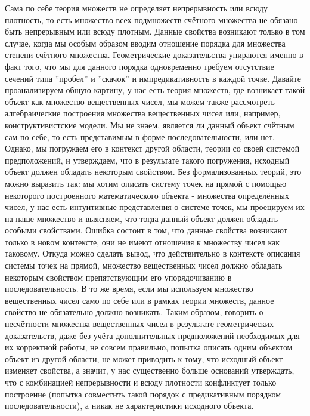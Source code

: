 \documentclass[12pt]{article}
\begin{document}
Сама по себе теория множеств не определяет непрерывность или всюду плотность, то есть множество всех подмножеств счётного множества не обязано быть непрерывным или всюду плотным. Данные свойства возникают только в том случае, когда мы особым образом вводим отношение порядка для множества степени счётного множества. Геометрические доказательства упираются именно в факт того, что мы для данного порядка одновременно требуем отсутствие сечений типа ''пробел'' и ''скачок'' и импредикативность в каждой точке. Давайте проанализируем общую картину, у нас есть теория множеств, где возникает такой объект как множество вещественных чисел, мы можем также рассмотреть алгебраические построения множества вещественных чисел или, например, конструктивистские модели. Мы не знаем, является ли данный объект счётным сам по себе, то есть представимым в форме последовательности, или нет. Однако, мы погружаем его в контекст другой области, теории со своей системой предположений, и утверждаем, что в результате такого погружения, исходный объект должен обладать некоторым свойством. Без формализованных теорий, это можно выразить так: мы хотим описать систему точек на прямой с помощью некоторого построенного математического объекта - множества определённых чисел, у нас есть интуитивные представления о системе точек, мы проецируем их на наше множество и выясняем, что тогда данный объект должен обладать особыми свойствами. Ошибка состоит в том, что данные свойства возникают только в новом контексте, они не имеют отношения к множеству чисел как таковому. Откуда можно сделать вывод, что действительно в контексте описания системы точек на прямой, множество вещественных чисел должно обладать некоторым свойством препятствующим его упорядочиванию в последовательность. В то же время, если мы используем множество вещественных чисел само по себе или в рамках теории множеств, данное свойство не обязательно должно возникать. Таким образом, говорить о несчётности множества вещественных чисел в результате геометрических доказательств, даже без учёта дополнительных предположений необходимых для их корректной работы, не совсем правильно, попытка описать одним объектом объект из другой области, не может приводить к тому, что исходный объект изменяет свойства, а значит, у нас существенно больше оснований утверждать, что с комбинацией непрерывности и всюду плотности конфликтует только построение (попытка совместить такой порядок с предикативным порядком последовательности), а никак не характеристики исходного объекта. 
\end{document}
